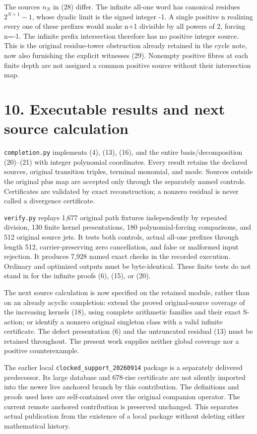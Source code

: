 The sources \(n_N\) in (28) differ. The infinite all-one word has
canonical residues \(2^{N+1}-1\), whose dyadic limit is the signed
integer -1. A single positive n realizing every one of these prefixes
would make n+1 divisible by all powers of 2, forcing n=-1. The infinite
prefix intersection therefore has no positive integer source. This is
the original residue-tower obstruction already retained in the cycle
note, now also furnishing the explicit witnesses (29). Nonempty positive
fibres at each finite depth are not assigned a common positive source
without their intersection map.

\section{10. Executable results and next source calculation}

\nolinkurl{completion.py} implements (4), (13), (16), and the entire
basis/decomposition (20)--(21) with integer polynomial coordinates.
Every result retains the declared sources, original transition triples,
terminal monomial, and mode. Sources outside the original plus map are
accepted only through the separately named controls. Certificates are
validated by exact reconstruction; a nonzero residual is never called a
divergence certificate.

\nolinkurl{verify.py} replays 1,677 original path fixtures independently
by repeated division, 130 finite kernel presentations, 180
polynomial-forcing comparisons, and 512 original source jets. It tests
both controls, actual all-one prefixes through length 512,
carrier-preserving zero cancellation, and false or malformed input
rejection. It produces 7,928 named exact checks in the recorded
execution. Ordinary and optimized outputs must be byte-identical. These
finite tests do not stand in for the infinite proofs (6), (15), or (20).

The next source calculation is now specified on the retained module,
rather than on an already acyclic completion: extend the proved
original-source coverage of the increasing kernels (18), using complete
arithmetic families and their exact S-action; or identify a nonzero
original singleton class with a valid infinite certificate. The defect
presentation (6) and the untruncated residual (13) must be retained
throughout. The present work supplies neither global coverage nor a
positive counterexample.

The earlier local \nolinkurl{clocked_support_20260914} package is a
separately delivered predecessor. Its large database and 678-rise
certificate are not silently imported into the newer live anchored
branch by this contribution. The definitions and proofs used here are
self-contained over the original companion operator. The current remote
anchored contribution is preserved unchanged. This separates actual
publication from the existence of a local package without deleting
either mathematical history.

